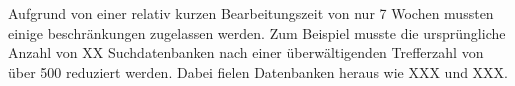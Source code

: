 Aufgrund von einer relativ kurzen Bearbeitungszeit von nur 7 Wochen mussten einige beschränkungen zugelassen werden.
Zum Beispiel musste die ursprüngliche Anzahl von XX Suchdatenbanken nach einer überwältigenden Trefferzahl von über 500
reduziert werden. Dabei fielen Datenbanken heraus wie XXX und XXX.